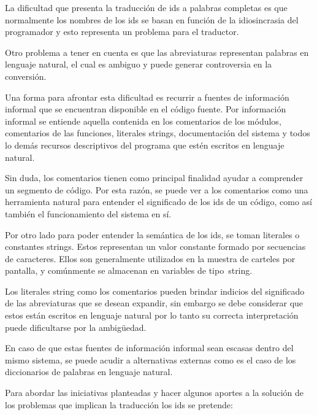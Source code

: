 \documentclass[a4paper,12pt]{report}
\begin{document}
La dificultad que presenta la traducción de ids a palabras completas es que normalmente los nombres de los ids se basan en función de la idiosincrasia del programador\cite{LFBEX07, EHPV09} y esto representa un problema para el traductor. 

Otro problema a tener en cuenta es que las abreviaturas representan palabras en lenguaje natural, el cual es ambiguo y puede generar controversia en la conversión.

Una forma para afrontar esta dificultad es recurrir a fuentes de información informal que se encuentran disponible en el código fuente. Por información informal se entiende aquella contenida en los comentarios de los módulos, comentarios de las funciones, literales strings, documentación del sistema y todos lo demás recursos descriptivos del programa que estén escritos en lenguaje natural.


Sin duda, los comentarios tienen como principal finalidad ayudar a comprender un segmento de código\cite{JDPH08}. Por esta razón, se puede ver a los comentarios como una herramienta natural para entender el significado de los ids de un código, como así también el funcionamiento del sistema en sí.

Por otro lado para poder entender la semántica de los ids, se toman li\-terales o constantes strings.
Estos representan un valor constante formado por secuencias de caracteres. Ellos son generalmente utilizados en la muestra de carteles por pantalla, y comúnmente se almacenan en variables de \mbox{tipo string.}

Los literales string como los comentarios pueden brindar indicios del significado de las abreviaturas que se desean expandir, sin embargo se debe considerar que estos están escritos en lenguaje natural por lo tanto su co\-rrecta interpretación puede dificultarse por la ambigüedad.

En caso de que estas fuentes de información informal sean escasas dentro del mismo sistema, se puede acudir a alternativas externas como es el caso de los diccionarios de palabras en lenguaje natural.

Para abordar las iniciativas planteadas y hacer algunos aportes a la solución de los problemas que implican la traducción los ids se pretende:
\end{document}
